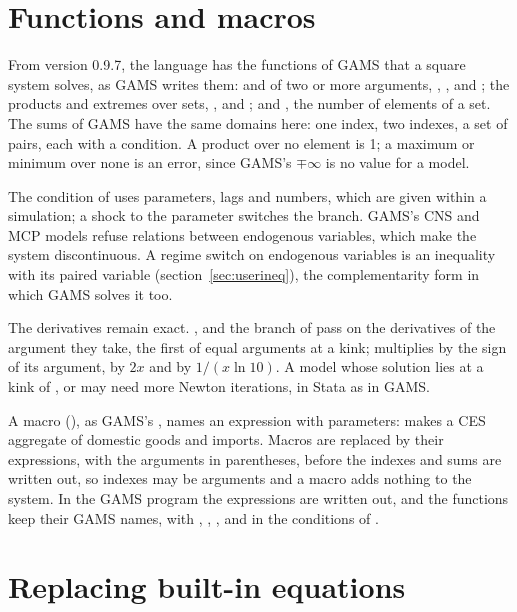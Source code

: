 \section{Functions and macros}\label{sec:userfunctions}

From version 0.9.7, the language has the functions of GAMS that a square
system solves, as GAMS writes them:  and
 of two or more arguments, , ,
 and ; the products and extremes
over sets, ,  and ; and , the
number of elements of a set. The sums of GAMS have the same domains here:
one index, two indexes, a set of pairs, each with a condition. A product over
no element is 1; a maximum or minimum over none is an error, since GAMS's
$\mp\infty$ is no value for a model.

The condition of  uses parameters, lags and numbers, which are
given within a simulation; a shock to the parameter switches the branch.
GAMS's CNS and MCP models refuse relations between endogenous variables, which
make the system discontinuous. A regime switch on endogenous variables is an
inequality with its paired variable (section~\ref{sec:userineq}), the
complementarity form in which GAMS solves it too.

The derivatives remain exact. ,  and the branch of
 pass on the derivatives of the argument they take, the first of
equal arguments at a kink;  multiplies by the sign of its argument,
 by $2x$ and  by $1/(x \ln 10)$. A model whose
solution lies at a kink of ,  or  may need
more Newton iterations, in Stata as in GAMS.

A macro (), as GAMS's , names an expression with
parameters:  makes  a CES aggregate of
domestic goods and imports. Macros are replaced by their expressions, with the
arguments in parentheses, before the indexes and sums are written out, so
indexes may be arguments and a macro adds nothing to the system. In the GAMS
program the expressions are written out, and the functions keep their GAMS
names, with , , ,  and  in the
conditions of .

\section{Replacing built-in equations}\label{sec:userreplace}

